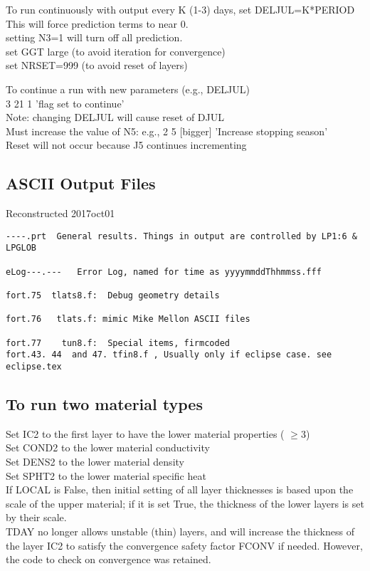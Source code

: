 \documentclass{article}
\newcommand{\qi}{\\ \hspace*{2.em}}      %
\begin{document}
To run continuously with output every K (1-3) days, set DELJUL=K*PERIOD
This will force prediction terms to near 0.
\qi        setting N3=1 will turn off all prediction.
\qi        set GGT large (to avoid iteration for convergence)
\qi        set NRSET=999 (to avoid reset of layers)

To continue a run with new parameters (e.g., DELJUL)
\qi	3 21 1 'flag set to continue' \\
Note: changing DELJUL will cause reset of DJUL \\
Must increase the value of N5: e.g., 2 5 [bigger] 'Increase stopping season' 
\qi Reset will not occur because J5 continues incrementing


\subsection{ASCII Output Files} %
Reconstructed  2017oct01
\vspace{-3.mm}
\begin{verbatim}
----.prt  General results. Things in output are controlled by LP1:6 & LPGLOB

eLog---.---   Error Log, named for time as yyyymmddThhmmss.fff

fort.75  tlats8.f:  Debug geometry details

fort.76   tlats.f: mimic Mike Mellon ASCII files

fort.77    tun8.f:  Special items, firmcoded
fort.43. 44  and 47. tfin8.f , Usually only if eclipse case. see eclipse.tex 

\end{verbatim}

\subsection{ To run two material types } %

Set IC2 to the first layer to have the lower material properties ( $\geq 3$) \\
Set COND2 to the lower material conductivity \\
Set DENS2 to the lower material density \\
Set SPHT2 to the lower material specific heat \\
If LOCAL is False, then initial setting of all layer thicknesses is based
upon the scale of the upper material; if it is set True, the thickness of the
lower layers is set by their scale. \\
  TDAY no longer allows unstable (thin) layers, and will increase the thickness
of the layer IC2 to satisfy the convergence safety factor FCONV if needed. 
However, the code to check on convergence was retained.
\end{document}
